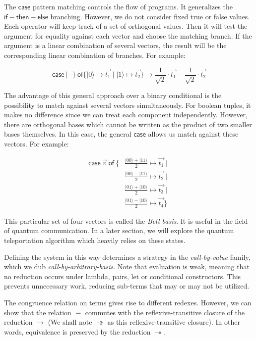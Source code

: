 \documentclass[runningheads,orivec]{llncs}
\newcommand\ket[1]{\ensuremath{|#1\rangle}}
\def\case#1#2#3#4#5{\ensuremath{\mathsf{case}~#1~\mathsf{of} \{#2\mapsto #4 \mid #3\mapsto #5\}}}
\def\evalone{\rightarrow}
\def\eval{\twoheadrightarrow}
\begin{document}
The $\mathsf{case}$ pattern matching controls the flow of programs. It generalizes the $\mathsf{if-then-else}$ branching. However, we do not consider fixed true or false values. Each operator will keep track of a set of orthogonal values. Then it will test the argument for equality against each vector and choose the matching branch. If the argument is a linear combination of several vectors, the result will be the corresponding linear combination of branches. For example:

\[
  \case{\ket{-}}{\ket{0}}{\ket{1}}{\vec{t_1}}{\vec{t_2}} \evalone
  \frac{1}{\sqrt{2}}\cdot\vec{t_1} - \frac{1}{\sqrt{2}}\cdot\vec{t_2}
\]

The advantage of this general approach over a binary conditional is the possibility to match against several vectors simultaneously. For boolean tuples, it makes no difference since we can treat each component independently. However, there are orthogonal bases which cannot be written as the product of two smaller bases themselves. In this case, the general $\mathsf{case}$ allows us match against these vectors. For example:

\begin{align*}
  \mathsf{case}\ \vec{v}\ \mathsf{of}\ \{ 
  &\frac{\ket{00} + \ket{11}}{2}\mapsto \vec{t_1} \mid\\
  &\frac{\ket{00} - \ket{11}}{2}\mapsto \vec{t_2} \mid\\
  &\frac{\ket{01} + \ket{10}}{2}\mapsto \vec{t_3} \mid\\
  &\frac{\ket{01} - \ket{10}}{2}\mapsto \vec{t_4} \}
\end{align*}

This particular set of four vectors is called the \textit{Bell basis}. It is useful in the field of quantum communication. In a later section, we will explore the quantum teleportation algorithm which heavily relies on these states. 

Defining the system in this way determines a strategy in the \textit{call-by-value} family, which we dub \textit{call-by-arbitrary-basis}. Note that evaluation is weak, meaning that no reduction occurs under lambda, pairs, let or conditional constructors. This prevents unnecessary work, reducing sub-terms that may or may not be utilized.

The congruence relation on terms gives rise to different redexes. However, we can show that the relation $\equiv$ commutes with the reflexive-transitive closure of the reduction $\evalone$ (We shall note $\eval$ as this reflexive-transitive closure). In other words, equivalence is preserved by the reduction $\eval$.
\end{document}
